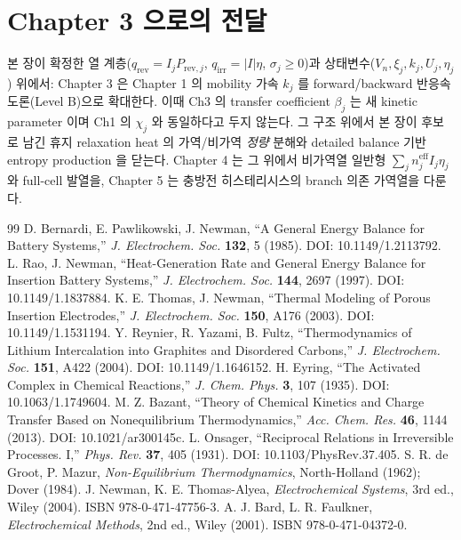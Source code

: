 \documentclass[11pt,a4paper]{article}
\newcommand{\eff}{\mathrm{eff}}
\newcommand{\irr}{\mathrm{irr}}
\newcommand{\rev}{\mathrm{rev}}
\begin{document}
\section*{Chapter 3 으로의 전달}
본 장이 확정한 열 계층($q_\rev=I_jP_{\rev,j}$, $q_\irr=|I|\eta$, $\sigma_j\ge0$)과 상태변수($V_n,\xi_j,k_j,U_j,
\eta_j$) 위에서: Chapter 3 은 Chapter 1 의 mobility 가속 $k_j$ 를 forward/backward 반응속도론(Level B)으로 확대한다.
이때 Ch3 의 transfer coefficient $\beta_j$ 는 새 kinetic parameter 이며 Ch1 의 $\chi_j$ 와 동일하다고 두지 않는다.
그 구조 위에서 본 장이 후보로 남긴 휴지 relaxation heat 의 가역/비가역 \emph{정량} 분해와
detailed balance 기반 entropy production 을 닫는다. Chapter 4 는 그 위에서 비가역열 일반형
$\sum_j n_j^{\eff}I_j\eta_j$ 와 full-cell 발열을, Chapter 5 는 충방전 히스테리시스의 branch 의존 가역열을 다룬다.

\begin{thebibliography}{99}
 D. Bernardi, E. Pawlikowski, J. Newman, ``A General Energy Balance for Battery
  Systems,'' \emph{J. Electrochem. Soc.} \textbf{132}, 5 (1985). DOI: 10.1149/1.2113792.
 L. Rao, J. Newman, ``Heat-Generation Rate and General Energy Balance for Insertion
  Battery Systems,'' \emph{J. Electrochem. Soc.} \textbf{144}, 2697 (1997). DOI: 10.1149/1.1837884.
 K. E. Thomas, J. Newman, ``Thermal Modeling of Porous Insertion Electrodes,''
  \emph{J. Electrochem. Soc.} \textbf{150}, A176 (2003). DOI: 10.1149/1.1531194.
 Y. Reynier, R. Yazami, B. Fultz, ``Thermodynamics of Lithium Intercalation into
  Graphites and Disordered Carbons,'' \emph{J. Electrochem. Soc.} \textbf{151}, A422 (2004).
  DOI: 10.1149/1.1646152.
 H. Eyring, ``The Activated Complex in Chemical Reactions,'' \emph{J. Chem. Phys.}
  \textbf{3}, 107 (1935). DOI: 10.1063/1.1749604.
 M. Z. Bazant, ``Theory of Chemical Kinetics and Charge Transfer Based on
  Nonequilibrium Thermodynamics,'' \emph{Acc. Chem. Res.} \textbf{46}, 1144 (2013).
  DOI: 10.1021/ar300145c.
 L. Onsager, ``Reciprocal Relations in Irreversible Processes. I,'' \emph{Phys. Rev.}
  \textbf{37}, 405 (1931). DOI: 10.1103/PhysRev.37.405.
 S. R. de Groot, P. Mazur, \emph{Non-Equilibrium Thermodynamics},
  North-Holland (1962); Dover (1984).
 J. Newman, K. E. Thomas-Alyea, \emph{Electrochemical Systems}, 3rd ed., Wiley (2004).
  ISBN 978-0-471-47756-3.
 A. J. Bard, L. R. Faulkner, \emph{Electrochemical Methods}, 2nd ed., Wiley (2001).
  ISBN 978-0-471-04372-0.
\end{thebibliography}
\end{document}
